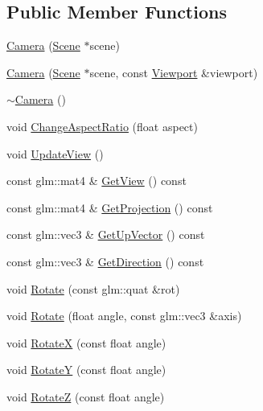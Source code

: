 \subsection*{Public Member Functions}
\begin{DoxyCompactItemize}
\item 
\mbox{\hyperlink{classec_1_1_camera_a5b8034c32e082171bdb61033781cdcc3}{Camera}} (\mbox{\hyperlink{classec_1_1_scene}{Scene}} $\ast$scene)
\item 
\mbox{\hyperlink{classec_1_1_camera_ab5fa55c91ae586754b613c3e8f33b31c}{Camera}} (\mbox{\hyperlink{classec_1_1_scene}{Scene}} $\ast$scene, const \mbox{\hyperlink{classec_1_1_viewport}{Viewport}} \&viewport)
\item 
\mbox{\hyperlink{classec_1_1_camera_a11d706554e37d6dde0b9313a445cbd4b}{$\sim$\+Camera}} ()
\item 
void \mbox{\hyperlink{classec_1_1_camera_ad3790ce4b558aa906fe00e25d8c8c1ed}{Change\+Aspect\+Ratio}} (float aspect)
\item 
void \mbox{\hyperlink{classec_1_1_camera_aa358a0b0f9878f3ea39cfb5bccd9ddb9}{Update\+View}} ()
\item 
const glm\+::mat4 \& \mbox{\hyperlink{classec_1_1_camera_ad5ed2007c501081561fd8ee894f86ae0}{Get\+View}} () const
\item 
const glm\+::mat4 \& \mbox{\hyperlink{classec_1_1_camera_a9c52ad9d4077faf50d1d7170d08e1f13}{Get\+Projection}} () const
\item 
const glm\+::vec3 \& \mbox{\hyperlink{classec_1_1_camera_a286e78e35fe712ee2d685e73a126617f}{Get\+Up\+Vector}} () const
\item 
const glm\+::vec3 \& \mbox{\hyperlink{classec_1_1_camera_a45373436f96d65d84fa77157cf5d80d2}{Get\+Direction}} () const
\item 
void \mbox{\hyperlink{classec_1_1_camera_a8d9b7b4944f32e685eef162f50a96d44}{Rotate}} (const glm\+::quat \&rot)
\item 
void \mbox{\hyperlink{classec_1_1_camera_a3cfaa2574d9fe5b90f255cf4e8b9fcae}{Rotate}} (float angle, const glm\+::vec3 \&axis)
\item 
void \mbox{\hyperlink{classec_1_1_camera_ac6233a1acdef77bfb7f86d8bf320119d}{RotateX}} (const float angle)
\item 
void \mbox{\hyperlink{classec_1_1_camera_afc7a198a827b5b35008495ea34ab48b3}{RotateY}} (const float angle)
\item 
void \mbox{\hyperlink{classec_1_1_camera_a5cd0489cfedea9b16f8ce21cf3474978}{RotateZ}} (const float angle)
\item 

\end{DoxyCompactItemize}
